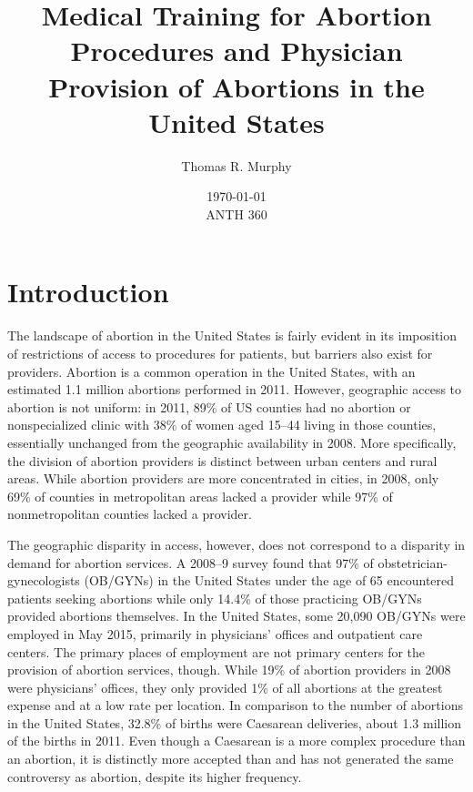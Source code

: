 \documentclass[letterpaper, 12pt]{article}
\title{Medical Training for Abortion Procedures and Physician Provision of Abortions in the United States}
\author{Thomas R. Murphy}
\date{\today\\ANTH 360}
\begin{document}
\maketitle


\section*{Introduction}

The landscape of abortion in the United States is fairly evident in its imposition of restrictions of access to procedures for patients, but barriers also exist for providers.
Abortion is a common operation in the United States, with an estimated 1.1 million abortions performed in 2011. \autocite[pg. 7]{jones_abortion_2014}
However, geographic access to abortion is not uniform: in 2011, 89\% of US counties had no abortion or nonspecialized clinic with 38\% of women aged 15--44 living in those counties, essentially unchanged from the geographic availability in 2008. \autocite[pg. 7]{jones_abortion_2014}
More specifically, the division of abortion providers is distinct between urban centers and rural areas.
While abortion providers are more concentrated in cities, in 2008, only 69\% of counties in metropolitan areas lacked a provider while 97\% of nonmetropolitan counties lacked a provider. \autocite[pg. 46]{jones_abortion_2011}

The geographic disparity in access, however, does not correspond to a disparity in demand for abortion services.
A 2008--9 survey found that 97\% of obstetrician-gynecologists (OB/GYNs) in the United States under the age of 65 encountered patients seeking abortions while only 14.4\% of those practicing OB/GYNs provided abortions themselves. \autocite[pg. 611]{stulberg_abortion_2011}
In the United States, some 20,090 OB/GYNs were employed in May 2015, primarily in physicians' offices and outpatient care centers. \autocite{occupational_employment_and_wages_may_2015}
The primary places of employment are not primary centers for the provision of abortion services, though.
While 19\% of abortion providers in 2008 were physicians' offices, they only provided 1\% of all abortions at the greatest expense and at a low rate per location. \autocite[pg. 46--7]{jones_abortion_2011}
In comparison to the number of abortions in the United States, 32.8\% of births were Caesarean deliveries, about 1.3 million of the births in 2011. \autocite[pg. 5]{martin_births_2013}
Even though a Caesarean is a more complex procedure than an abortion, it is distinctly more accepted than and has not generated the same controversy as abortion, despite its higher frequency.
\end{document}

